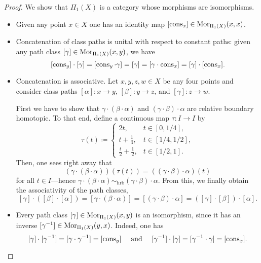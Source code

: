 \begin{proof}
We show that \(\Pi_1(X)\) is a category whose morphisms are isomorphisms.
\begin{itemize}\setlength\itemsep{0em}
\item Given any point \(x \in X\) one has an identity map
  \([\operatorname{cons}_x] \in \operatorname{Mor}_{\Pi_1(X)}(x, x)\).

\item Concatenation of class paths is unital with respect to constant paths:
  given any path class \([\gamma] \in \operatorname{Mor}_{\Pi_1(X)}(x, y)\), we have
  \[
  [\operatorname{cons}_y] \cdot [\gamma]
  = [\operatorname{cons}_y \cdot \gamma]
  = [\gamma]
  = [\gamma \cdot \operatorname{cons}_x]
  = [\gamma] \cdot [\operatorname{cons}_x].
  \]

\item Concatenation is associative. Let \(x, y, z, w \in X\) be any four points
  and consider class paths \([\alpha]: x \to y\), \([\beta]: y \to z\), and
  \([\gamma]: z \to w\).

  First we have to show that \(\gamma \cdot (\beta \cdot \alpha)\) and
  \((\gamma \cdot \beta) \cdot \alpha\) are relative boundary homotopic. To that
  end, define a continuous map \(\tau: I \to I\) by
  \[
  \tau(t) \coloneq
  \begin{cases}
    2 t, &t \in [0, 1/4], \\
    t + \frac{1}{4}, &t \in [1/4, 1/2], \\
    \frac{t}{2} + \frac{1}{2}, &t \in [1/2, 1].
  \end{cases}
  \]
  Then, one sees right away that
  \[
  (\gamma \cdot (\beta \cdot \alpha))(\tau(t))
  = ((\gamma \cdot \beta) \cdot \alpha)(t)
  \]
  for all \(t \in I\)---hence \(\gamma \cdot (\beta \cdot \alpha)
  \sim_{\text{hrb}} (\gamma \cdot \beta) \cdot \alpha\). From this, we finally
  obtain the associativity of the path classes,
  \[
  [\gamma] \cdot ([\beta] \cdot [\alpha])
  = [\gamma \cdot (\beta \cdot \alpha)]
  = [(\gamma \cdot \beta) \cdot \alpha]
  = ([\gamma] \cdot [\beta]) \cdot [\alpha].
  \]

\item Every path class \([\gamma] \in \operatorname{Mor}_{\Pi_1(X)}(x, y)\) is an isomorphism,
  since it has an inverse \([\gamma^{-1}] \in \operatorname{Mor}_{\Pi_1(X)}(y, x)\). Indeed,
  one has
  \[
  [\gamma] \cdot [\gamma^{-1}] = [\gamma \cdot \gamma^{-1}] = [\operatorname{cons}_y]
  \quad\text{ and }\quad
  [\gamma^{-1}] \cdot [\gamma] = [\gamma^{-1} \cdot \gamma] = [\operatorname{cons}_x].
  \]
\end{itemize}
\end{proof}

